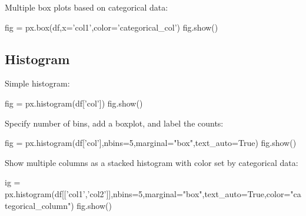 Multiple box plots based on categorical data:

\begin{pycode}
    fig = px.box(df,x='col1',color='categorical_col')
    fig.show()
\end{pycode}

\subsection{Histogram}

Simple histogram:

\begin{pycode}
    fig = px.histogram(df['col'])
    fig.show()
\end{pycode}

Specify number of bins, add a boxplot, and label the counts:

\begin{pycode}
    fig = px.histogram(df['col'],nbins=5,marginal="box",text_auto=True)
    fig.show()
\end{pycode}

Show multiple columns as a stacked histogram with color set by categorical data:

\begin{pycode}
    ig = px.histogram(df[['col1','col2']],nbins=5,marginal="box",text_auto=True,color="categorical_column")
    fig.show()
\end{pycode}
